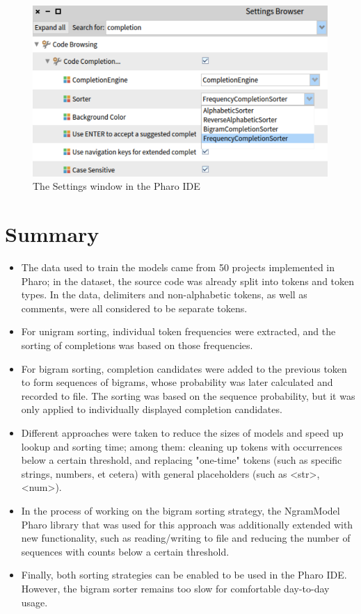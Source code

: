 \begin{figure}[H]
    \centering
    \includegraphics[width=0.9\linewidth]{images/settings.png}
    \caption{The Settings window in the Pharo IDE}
    \label{fig:settings}
\end{figure}

\section{Summary}
\label{sec:ProposedSolution-Summary}
\begin{itemize}
    \item The data used to train the models came from 50 projects implemented in Pharo; in the dataset, the source code was already split into tokens and token types. In the data, delimiters and non-alphabetic tokens, as well as comments, were all considered to be separate tokens.
    \item For unigram sorting, individual token frequencies were extracted, and the sorting of completions was based on those frequencies.
    \item For bigram sorting, completion candidates were added to the previous token to form sequences of bigrams, whose probability was later calculated and recorded to file. The sorting was based on the sequence probability, but it was only applied to individually displayed completion candidates.
    \item Different approaches were taken to reduce the sizes of models and speed up lookup and sorting time; among them: cleaning up tokens with occurrences below a certain threshold, and replacing "one-time" tokens (such as specific strings, numbers, et cetera) with general placeholders (such as <str>, <num>).
    \item In the process of working on the bigram sorting strategy, the NgramModel Pharo library that was used for this approach was additionally extended with new functionality, such as reading/writing to file and reducing the number of sequences with counts below a certain threshold.
    \item Finally, both sorting strategies can be enabled to be used in the Pharo IDE. However, the bigram sorter remains too slow for comfortable day-to-day usage.
\end{itemize}